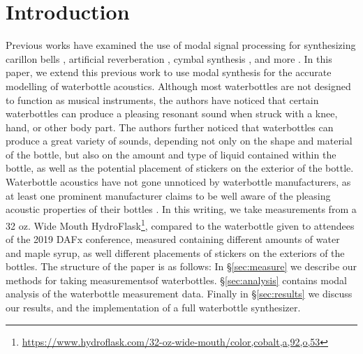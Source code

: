 \documentclass[twoside,a4paper]{article}
\title{\papertitle}
\affiliation{
\paperauthorA \, }
{\href{http://ccrma.stanford.edu}{Center for Computer Research in Music and Acoustics} \\ Stanford University \\ Palo Alto, CA \\ {\tt\{kermit|mrau|jatin\}@ccrma.stanford.edu}}
\newif\ifpdf
\begin{document}
\ifpdf %
  \DeclareGraphicsExtensions{.png,.jpg,.pdf}
\else  %
\fi

\maketitle
%
\begin{abstract}
We present a method for accurately synthesizing the acoustic response
of a waterbottle using modal signal processing. We take extensive
measurements of two waterbottles with considerations for the water
contained within the bottles, and stickers attached to the exterior
of the bottles. We perform modal analysis of these measurements and
implement a modal waterbottle model as a real-time synthesizer.
\end{abstract}

\section{Introduction} \label{sec:intro}
%
Previous works have examined the use of modal signal processing
for synthesizing carillon bells
\cite{canfielddafilou:werner:bellEffects:2017,rau:das:canfielddafilou:carillon:2019},
artificial reverberation \cite{abel2014a}, cymbal synthesis \cite{travis_cymbals},
and more \cite{abel_kurt_modal}.
In this paper, we extend this previous work to use modal synthesis
for the accurate modelling of waterbottle acoustics.
\newline\newline
Although most waterbottles are not designed to function as musical
instruments, the authors have noticed that certain waterbottles
can produce a pleasing resonant sound when struck with a knee, hand,
or other body part. The authors further noticed that waterbottles can
produce a great variety of sounds, depending not only on the shape and
material of the bottle, but also on the amount and type of liquid contained
within the bottle, as well as the potential placement of stickers on the
exterior of the bottle. Waterbottle acoustics have not gone unnoticed
by waterbottle manufacturers, as at least one prominent manufacturer claims
to be well aware of the pleasing acoustic properties of their bottles
\cite{hydroflask_email}.
In this writing, we take measurements from a 32 oz. Wide Mouth
HydroFlask\footnote{\url{https://www.hydroflask.com/32-oz-wide-mouth/color,cobalt,a,92,o,53}},
compared to the waterbottle given to attendees of the 2019 DAFx
conference, measured containing different amounts of water and maple
syrup, as well different placements of stickers on the exteriors of the
bottles.
\newline\newline
The structure of the paper is as follows: In \S\ref{sec:measure} we describe
our methods for taking measurementsof waterbottles. \S\ref{sec:analysis}
contains modal analysis of the waterbottle measurement data.
Finally in \S\ref{sec:results} we discuss our results, and the
implementation of a full waterbottle synthesizer.
\end{document}
